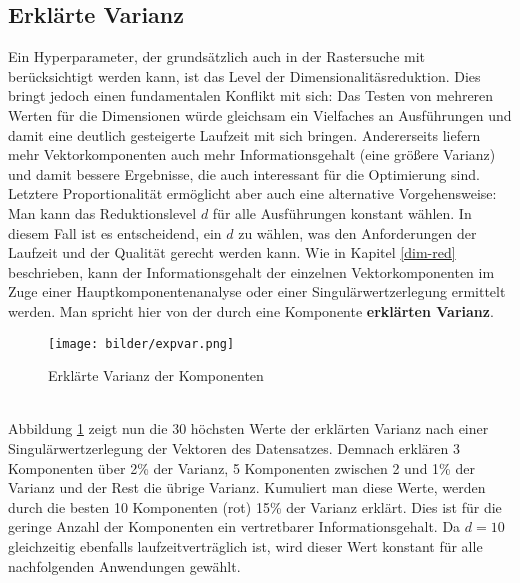 \subsection{Erklärte Varianz}
Ein Hyperparameter, der grundsätzlich auch in der Rastersuche mit berücksichtigt werden kann, ist das Level der Dimensionalitäsreduktion. Dies bringt jedoch einen fundamentalen Konflikt mit sich: Das Testen von mehreren Werten für die Dimensionen würde gleichsam ein Vielfaches an Ausführungen und damit eine deutlich gesteigerte Laufzeit mit sich bringen. Andererseits liefern mehr Vektorkomponenten auch mehr Informationsgehalt (eine größere Varianz) und damit bessere Ergebnisse, die auch interessant für die Optimierung sind. Letztere Proportionalität ermöglicht aber auch eine alternative Vorgehensweise: Man kann das Reduktionslevel $d$ für alle Ausführungen konstant wählen. In diesem Fall ist es entscheidend, ein $d$ zu wählen, was den Anforderungen der Laufzeit und der Qualität gerecht werden kann. Wie in Kapitel \ref{dim-red} beschrieben, kann der Informationsgehalt der einzelnen Vektorkomponenten im Zuge einer Hauptkomponentenanalyse oder einer Singulärwertzerlegung ermittelt werden. Man spricht hier von der durch eine Komponente \textbf{erklärten Varianz}.
\begin{figure}[htb]
	\begin{center}
		\texttt{[image: bilder/expvar.png]}
		\caption{Erklärte Varianz der Komponenten}\label{expvar}
	\end{center}
\end{figure}\\
Abbildung \ref{expvar} zeigt nun die 30 höchsten Werte der erklärten Varianz nach einer Singulärwertzerlegung der Vektoren des Datensatzes. Demnach erklären 3 Komponenten über 2\% der Varianz, 5 Komponenten zwischen 2 und 1\% der Varianz und der Rest die übrige Varianz. Kumuliert man diese Werte, werden durch die besten 10 Komponenten (rot) 15\% der Varianz erklärt. Dies ist für die geringe Anzahl der Komponenten ein vertretbarer Informationsgehalt. Da $d = 10$ gleichzeitig ebenfalls laufzeitverträglich ist, wird dieser Wert konstant für alle nachfolgenden Anwendungen gewählt.
